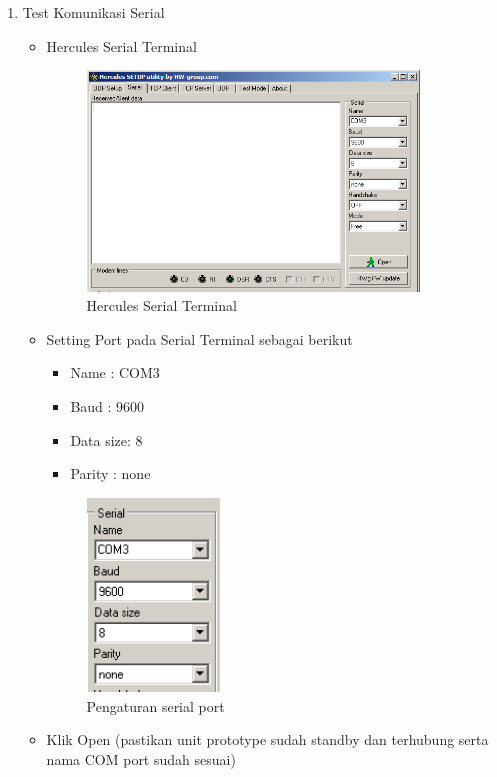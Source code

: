 \documentclass[12pt,]{article}
\begin{document}
\begin{enumerate}
\begin{itemize}
		\end{itemize}
	
		\newpage
		\item Test Komunikasi Serial
		\begin{itemize}
			\item Hercules Serial Terminal
			\begin{figure}[!ht]
				\centering
				\includegraphics[width=250pt]{images/terminal/hercules_terminal}
				\caption{Hercules Serial Terminal}
			\end{figure}
		
			\item Setting Port pada Serial Terminal sebagai berikut
			\begin{itemize}
				\item Name     : COM3
				\item Baud     : 9600
				\item Data size: 8
				\item Parity   : none
			\end{itemize}
		
			\begin{figure}[!ht]
				\centering
				\includegraphics[width=100pt]{images/terminal/hercules_port}
				\caption{Pengaturan serial port}
			\end{figure}
		
			\item Klik Open (pastikan unit prototype sudah standby dan terhubung
			serta nama COM port sudah sesuai)
			

\end{itemize}
\end{enumerate}
\end{document}
